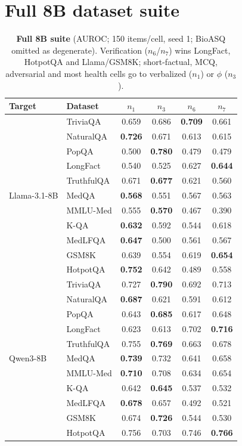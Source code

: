 \documentclass[11pt]{article}
\newcommand{\nverb}{$n_1$}     %
\newcommand{\nphi}{$n_3$}      %
\newcommand{\nyn}{$n_6$}       %
\newcommand{\nsc}{$n_7$}       %
\begin{document}
\section{Full 8B dataset suite}\label{app:suite}
\begin{table}[h]
\centering\small
\setlength{\tabcolsep}{4pt}
\begin{tabular}{llcccc}
\toprule
Target & Dataset & \nverb & \nphi & \nyn & \nsc \\
\midrule
\multirow{11}{*}{Llama-3.1-8B}
 & TriviaQA   & 0.659 & 0.686 & \textbf{0.709} & 0.661 \\
 & NaturalQA  & \textbf{0.726} & 0.671 & 0.613 & 0.615 \\
 & PopQA      & 0.500 & \textbf{0.780} & 0.479 & 0.479 \\
 & LongFact   & 0.540 & 0.525 & 0.627 & \textbf{0.644} \\
 & TruthfulQA & 0.671 & \textbf{0.677} & 0.621 & 0.560 \\
 & MedQA      & \textbf{0.568} & 0.551 & 0.567 & 0.563 \\
 & MMLU-Med   & 0.555 & \textbf{0.570} & 0.467 & 0.390 \\
 & K-QA       & \textbf{0.632} & 0.592 & 0.544 & 0.618 \\
 & MedLFQA    & \textbf{0.647} & 0.500 & 0.561 & 0.567 \\
 & GSM8K      & 0.639 & 0.554 & 0.619 & \textbf{0.654} \\
 & HotpotQA   & \textbf{0.752} & 0.642 & 0.489 & 0.558 \\
\midrule
\multirow{11}{*}{Qwen3-8B}
 & TriviaQA   & 0.727 & \textbf{0.790} & 0.692 & 0.713 \\
 & NaturalQA  & \textbf{0.687} & 0.621 & 0.591 & 0.612 \\
 & PopQA      & 0.643 & \textbf{0.685} & 0.617 & 0.648 \\
 & LongFact   & 0.623 & 0.613 & 0.702 & \textbf{0.716} \\
 & TruthfulQA & 0.755 & \textbf{0.769} & 0.663 & 0.678 \\
 & MedQA      & \textbf{0.739} & 0.732 & 0.641 & 0.658 \\
 & MMLU-Med   & \textbf{0.710} & 0.708 & 0.634 & 0.654 \\
 & K-QA       & 0.642 & \textbf{0.645} & 0.537 & 0.532 \\
 & MedLFQA    & \textbf{0.678} & 0.657 & 0.492 & 0.521 \\
 & GSM8K      & 0.674 & \textbf{0.726} & 0.544 & 0.530 \\
 & HotpotQA   & 0.756 & 0.703 & 0.746 & \textbf{0.766} \\
\bottomrule
\end{tabular}
\caption{\textbf{Full 8B suite} (AUROC; 150 items/cell, seed 1; BioASQ omitted as
degenerate). Verification (\nyn/\nsc) wins LongFact, HotpotQA and Llama/GSM8K; short-factual,
MCQ, adversarial and most health cells go to verbalized (\nverb) or $\phi$ (\nphi).}
\label{tab:suite}
\end{table}
\end{document}
